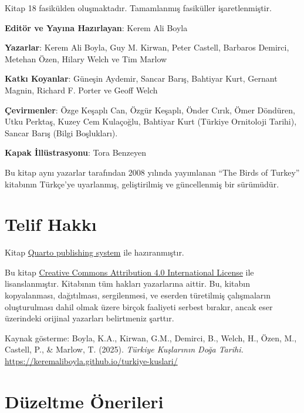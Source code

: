 \documentclass[
  a4paper,
  DIV=11,
  numbers=noendperiod]{scrartcl}
\begin{document}
Kitap 18 fasikülden oluşmaktadır. Tamamlanmış fasiküller
işaretlenmiştir.

\textbf{Editör ve Yayına Hazırlayan}: Kerem Ali Boyla

\textbf{Yazarlar}: Kerem Ali Boyla, Guy M. Kirwan, Peter Castell,
Barbaros Demirci, Metehan Özen, Hilary Welch ve Tim Marlow

\textbf{Katkı Koyanlar}: Güneşin Aydemir, Sancar Barış, Bahtiyar Kurt,
Gernant Magnin, Richard F. Porter ve Geoff Welch

\textbf{Çevirmenler}: Özge Keşaplı Can, Özgür Keşaplı, Önder Cırık, Ömer
Döndüren, Utku Perktaş, Kuzey Cem Kulaçoğlu, Bahtiyar Kurt (Türkiye
Ornitoloji Tarihi), Sancar Barış (Bilgi Boşlukları).

\textbf{Kapak İllüstrasyonu}: Tora Benzeyen

Bu kitap aynı yazarlar tarafından 2008 yılında yayımlanan ``The Birds of
Turkey'' kitabının Türkçe'ye uyarlanmış, geliştirilmiş ve güncellenmiş
bir sürümüdür.

\section*{Telif Hakkı}\label{telif-hakkux131}


Kitap \href{https://quarto.org/}{Quarto publishing system} ile
hazıranmıştır.

Bu kitap \href{https://creativecommons.org/licenses/by/4.0/}{Creative
Commons Attribution 4.0 International License} ile lisanslanmıştır.
Kitabının tüm hakları yazarlarına aittir. Bu, kitabın kopyalanması,
dağıtılması, sergilenmesi, ve eserden türetilmiş çalışmaların
oluşturulması dahil olmak üzere birçok faaliyeti serbest bırakır, ancak
eser üzerindeki orijinal yazarları belirtmeniz şarttır.

Kaynak gösterme: Boyla, K.A., Kirwan, G.M., Demirci, B., Welch, H.,
Özen, M., Castell, P., \& Marlow, T. (2025). \emph{Türkiye Kuşlarının
Doğa Tarihi.} \url{https://keremaliboyla.github.io/turkiye-kuslari/}

\section*{Düzeltme Önerileri}\label{duxfczeltme-uxf6nerileri}

\end{document}
